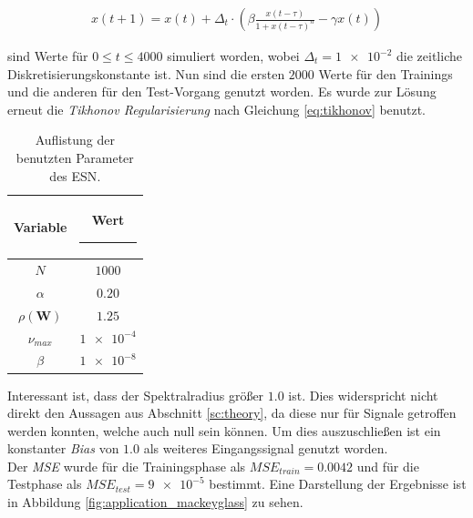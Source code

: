\begin{align}
x(t+1) = x(t) + \Delta_t \cdot \left(\beta \frac{x(t-\tau)}{1+x(t-\tau)^n}-\gamma x(t)  \right)
\end{align}

sind Werte für $0 \leq t \leq 4000$ simuliert worden, wobei $\Delta_t=\num{1e-2}$ die zeitliche Diskretisierungskonstante ist. Nun sind die ersten $2000$ Werte für den Trainings und die anderen für den Test-Vorgang genutzt worden. Es wurde zur Lösung erneut die \textit{Tikhonov Regularisierung} nach Gleichung \ref{eq:tikhonov} benutzt.

\begin{table}[H]
	\centering
		\begin{tabular}{|c|c|}
		\rule[-1ex]{0pt}{3.5ex} Variable & \hspace{4ex} Wert \rule[-1ex]{4ex}{0pt}\\ 
		\hline \hline 
		\rule[-1ex]{0pt}{3.5ex} $N$ & $1000$ \\ 
		\hline 
		\rule[-1ex]{0pt}{3.5ex} $\alpha$ & $0.20$ \\ 
		\hline 
		\rule[-1ex]{0pt}{3.5ex} $\rho(\mathbf{W})$ & $1.25$ \\ 
		\hline 
		\rule[-1ex]{0pt}{3.5ex} $\nu_{max}$ & $\num{1e-4}$ \\ 
		\hline 
		\rule[-1ex]{0pt}{3.5ex} $\beta$ & $\num{1e-8}$ \\ 
		\hline 
	\end{tabular} 
	\caption{Auflistung der benutzten Parameter des \textsc{ESN}.}
\label{tab:application_mackeyglass}
\end{table}

Interessant ist, dass der Spektralradius größer $1.0$ ist. Dies widerspricht nicht direkt den Aussagen aus Abschnitt \ref{sc:theory}, da diese nur für Signale getroffen werden konnten, welche auch null sein können. Um dies auszuschließen ist ein konstanter \textit{Bias} von $1.0$ als weiteres Eingangssignal genutzt worden.\\
Der \textit{MSE} wurde für die Trainingsphase als $MSE_{train} = 0.0042$ und für die Testphase als $MSE_{test} = \num{9e-5}$ bestimmt.
Eine Darstellung der Ergebnisse ist in Abbildung \ref{fig:application_mackeyglass} zu sehen.

